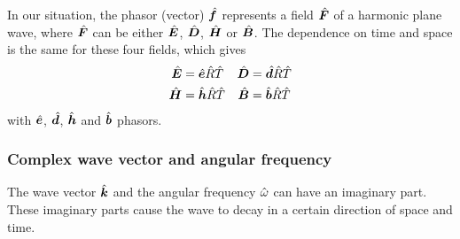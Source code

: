 In our situation, the phasor (vector) $\hat{\bm{f}}$ represents a field $\hat{\bm{F}}$ of a harmonic plane wave, where $\hat{\bm{F}}$ can be either $\hat{\bm{E}}$, $\hat{\bm{D}}$, $\hat{\bm{H}}$ or $\hat{\bm{B}}$.
The dependence on time and space is the same for these four fields, which gives
\begin{equation}
    \begin{aligned}
        \hat{\bm{E}} &= \hat{\bm{e}} \hat{R}\hat{T}
        &
        \hat{\bm{D}} &= \hat{\bm{d}} \hat{R}\hat{T}
        \\
        \hat{\bm{H}} &= \hat{\bm{h}} \hat{R}\hat{T}
        &
        \hat{\bm{B}} &= \hat{\bm{b}} \hat{R}\hat{T}
    \end{aligned}
    \label{eq:harmonic_plane_fields}
\end{equation}
with $\hat{\bm{e}}$, $\hat{\bm{d}}$, $\hat{\bm{h}}$ and $\hat{\bm{b}}$ phasors.

\subsubsection{Complex wave vector and angular frequency}
\label{sec:complex_k_omega}
The wave vector $\hat{\bm{k}}$ and the angular frequency $\hat{\omega}$ can have an imaginary part.
These imaginary parts cause the wave to decay in a certain direction of space and time.

